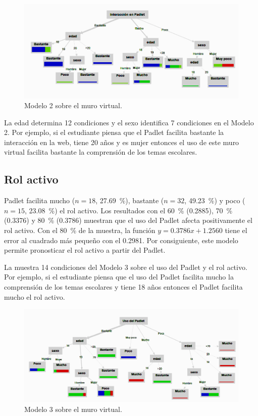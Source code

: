 \documentclass[spanish]{textolivre}
\begin{document}
\begin{figure}[h]
\centering
\begin{minipage}{.85\textwidth}
    \includegraphics[width=\linewidth]{Fig4.png}
    \caption{Modelo 2 sobre el muro virtual.}
    \label{fig4}
\end{minipage}
\end{figure}

La edad determina 12 condiciones y el sexo identifica 7 condiciones en el Modelo 2. Por ejemplo, si el estudiante piensa que el Padlet facilita bastante la interacción en la web, tiene 20 años y es mujer entonces el uso de este muro virtual facilita bastante la comprensión de los temas escolares.

\subsection{Rol activo}\label{sec-idioma}
Padlet facilita mucho ($n = 18$, 27.69~\%), bastante ($n = 32$, 49.23~\%) y poco ($n = 15$, 23.08~\%) el rol activo. Los resultados con el 60~\% (0.2885), 70~\% (0.3376) y 80~\% (0.3786) muestran que el uso del Padlet afecta positivamente el rol activo. Con el 80~\% de la muestra, la función $y = 0.3786x + 1.2560$ tiene el error al cuadrado más pequeño con el 0.2981. Por consiguiente, este modelo permite pronosticar el rol activo a partir del Padlet.

La  muestra 14 condiciones del Modelo 3 sobre el uso del Padlet y el rol activo. Por ejemplo, si el estudiante piensa que el uso del Padlet facilita mucho la comprensión de los temas escolares y tiene 18 años entonces el Padlet facilita mucho el rol activo. 

\begin{figure}[h]
\centering
\begin{minipage}{.85\textwidth}
    \includegraphics[width=\linewidth]{Fig5.png}
    \caption{Modelo 3 sobre el muro virtual.}
    \label{fig5}
\end{minipage}
\end{figure}
\end{document}
